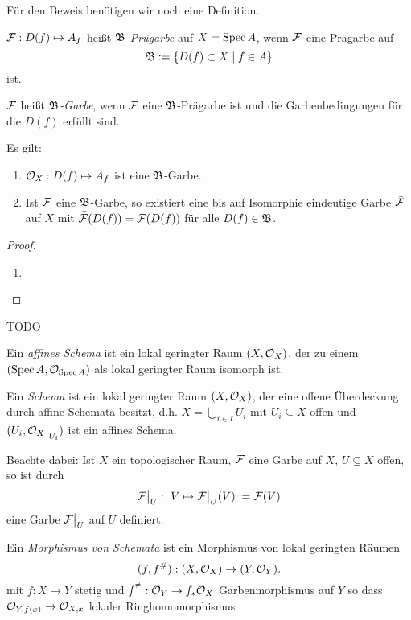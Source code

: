 Für den Beweis benötigen wir noch eine Definition.

\begin{definition}
	$\mathcal{F}:D(f) \mapsto A_f$ heißt \emph{$\mathfrak B$-Prügarbe} auf
	$X = \operatorname{Spec} A$, wenn 
	$\mathcal{F}$ eine Prägarbe auf 
	\[
		\mathfrak B := \{D(f) \subset X \mid f \in A\}
	\]
	ist.
	
	$\mathcal{F}$ heißt \emph{$\mathfrak B$-Garbe}, wenn $\mathcal{F}$ eine $\mathfrak B$-Prägarbe ist
	und die Garbenbedingungen für die $D(f)$ erfüllt sind.
\end{definition}

\begin{hilfslemma}
	\label{hilfslemma:1}
	Es gilt:
	\begin{enumerate}
	  \item $\mathcal{O}_X: D(f) \mapsto A_f$ ist eine $\mathfrak B$-Garbe.
	  \item Ist $\mathcal{F}$ eine $\mathfrak B$-Garbe, so existiert eine bis auf
	  	Isomorphie eindeutige Garbe $\bar {\mathcal{F}}$ auf $X$ mit
	  	$\bar{\mathcal{F}}(D(f)) = \mathcal{F}(D(f))$ für alle $D(f) \in \mathfrak B$.
	\end{enumerate}
\end{hilfslemma}
\begin{proof}
	\begin{enumerate}
	  \item 
	\end{enumerate}
\end{proof}


 TODO
 
 
\begin{definition}
	Ein \emph{affines Schema} ist ein lokal geringter Raum
	$(X,\mathcal{O}_X)$, der zu einem $(\operatorname{Spec} A, \mathcal{O}_{\operatorname{Spec} A})$ als lokal geringter
	Raum isomorph ist.
	
	Ein \emph{Schema} ist ein lokal geringter Raum $(X,\mathcal{O}_X)$, der eine
	offene Überdeckung durch affine Schemata besitzt, d.h.
	$X = \bigcup_{i\in I} U_i$ mit $U_i \subseteq X$ offen und 
	$(U_i, \mathcal{O}_X\big|_{U_i})$ ist ein affines Schema.
\end{definition}

\begin{bemerkung}
	Beachte dabei: Ist $X$ ein topologischer Raum, $\mathcal{F}$ eine Garbe auf $X$,
	$U\subseteq X$ offen, so ist durch
	\[
		\mathcal{F}\big|_{U}:\ V \mapsto \mathcal{F}\big|_{U} (V) := \mathcal{F}(V)
	\]
	eine Garbe $\mathcal{F}\big|_{U}$ auf $U$ definiert.
\end{bemerkung}

\begin{definition}
	Ein \emph{Morphismus von Schemata} ist ein
	Morphismus von lokal geringten Räumen
	\[
		(f,f^{\#}): (X, \mathcal{O}_X)  \to  (Y, \mathcal{O}_Y).
	\]
  mit $f:X \to Y$ stetig und $f^{^{\#}} : \mathcal{O}_Y \to f_*\mathcal{O}_X$ Garbenmorphismus
  auf $Y$ so dass $\mathcal{O}_{Y,f(x)}\to\mathcal{O}_{X,x}$ lokaler Ringhomomorphismus
\end{definition}

